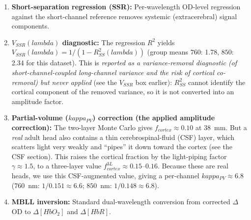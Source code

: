 \documentclass[12pt]{article}
\def\kappa{kappa}%
\def\lambda{lambda}%
\def\mathrm#1{#1}%
\def\text#1{#1}%
\begin{document}
\begin{enumerate}
\item \textbf{Short-separation regression (SSR):} Per-wavelength OD-level regression against the short-channel reference removes systemic (extracerebral) signal components.
\item \textbf{$V_{\text{SSR}}(\lambda)$ diagnostic:} The regression $R^2$ yields $V_{\text{SSR}}(\lambda) = 1/(1 - R^2_{\text{SS}}(\lambda))$ (group means $760$: 1.78, $850$: 2.34 for this dataset). This is \emph{reported as a variance-removal diagnostic (of short-channel-coupled long-channel variance and the risk of cortical co-removal) but never applied} (see the $V_{\mathrm{SSR}}$ box earlier): $R^2_{\text{SS}}$ cannot identify the cortical component of the removed variance, so it is not converted into an amplitude factor.
\item \textbf{Partial-volume ($\kappa_{\text{PV}}$) correction (the applied amplitude correction):} The two-layer Monte Carlo gives $f_{\text{cortex}}\approx0.10$ at 38~mm. But a \emph{real} adult head also contains a thin cerebrospinal-fluid (CSF) layer, which scatters light very weakly and ``pipes'' it down toward the cortex (see the CSF section). This raises the cortical fraction by the light-piping factor $\gamma\approx1.5$, to a three-layer value $f_{\text{cortex}}^{\mathrm{3L}}\approx0.15$--$0.16$. Because these are real heads, we use this CSF-augmented value, giving a per-channel $\kappa_{\text{PV}}\approx6.8$ ($760$~nm: $1/0.151\approx6.6$; $850$~nm: $1/0.148\approx6.8$).
\item \textbf{MBLL inversion:} Standard dual-wavelength conversion from corrected $\Delta$OD to $\Delta[\text{HbO}_2]$ and $\Delta[\text{HbR}]$.
\end{enumerate}
\end{document}
